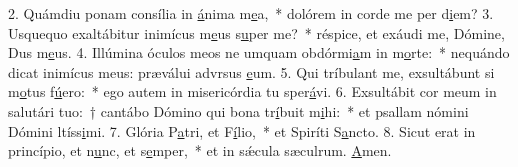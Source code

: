 2. Quámdiu ponam consília in \uline{á}nima m\uline{e}a,~* dolórem in corde me per d\uline{i}em?
3. Usquequo exaltábitur inimícus m\uline{e}us s\uline{u}per me?~* réspice, et exáudi me, Dómine, Dus m\uline{e}us.
4. Illúmina óculos meos ne umquam obdórmi\uline{a}m in m\uline{o}rte:~* nequándo dicat inimícus meus: præválui advrsus \uline{e}um.
5. Qui tríbulant me, exsultábunt si m\uline{o}tus f\uline{ú}ero:~* ego autem in misericórdia tu sper\uline{á}vi.
6. Exsultábit cor meum in salutári tuo:~† cantábo Dómino qui bona tr\uline{í}buit m\uline{i}hi:~* et psallam nómini Dómini ltíss\uline{i}mi.
7. Glória P\uline{a}tri, et F\uline{í}lio,~* et Spiríti S\uline{a}ncto.
8. Sicut erat in princípio, et n\uline{u}nc, et s\uline{e}mper,~* et in sǽcula sæculrum. \uline{A}men.
